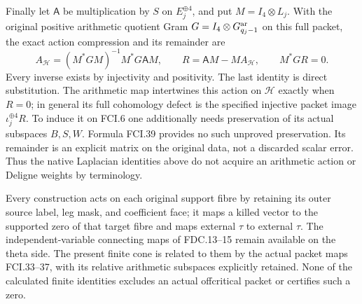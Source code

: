 Finally let $\mathsf A$ be multiplication by $S$ on $E_j^{\oplus4}$,
and put $M=I_4\otimes L_j$.  With the original positive
arithmetic quotient Gram $G=I_4\otimes G_{q_j-1}^{\rm ar}$ on this
full packet, the exact action
compression and its remainder are
\[
 A_{\mathcal H}=(M^*GM)^{-1}M^*G\mathsf A M,\qquad
 R=\mathsf A M-MA_{\mathcal H},\qquad M^*GR=0.
 \tag{FCI.39}
\]
Every inverse exists by injectivity and positivity.  The last identity
is direct substitution.  The arithmetic map intertwines this action
on $\mathcal H$ exactly when $R=0$; in general its full cohomology
defect is the specified injective packet image $\iota_j^{\oplus4}R$.
To induce it on FCI.6 one additionally needs preservation of its actual
subspaces $B,S,W$.  Formula FCI.39 provides no such unproved preservation.
Its remainder is an explicit matrix on the original data, not a
discarded scalar error.  Thus the native Laplacian identities above
do not acquire an arithmetic action or Deligne weights by terminology.

Every construction acts on each original support fibre by retaining its
outer source label, leg mask, and coefficient face; it maps a killed
vector to the supported zero of that target fibre and maps external
$\tau$ to external $\tau$.  The independent-variable connecting maps
of FDC.13--15 remain available on the theta side.  The present finite
cone is related to them by the actual packet maps FCI.33--37, with
its relative arithmetic subspaces explicitly retained.  None of the
calculated finite identities excludes an actual offcritical packet or
certifies such a zero.
